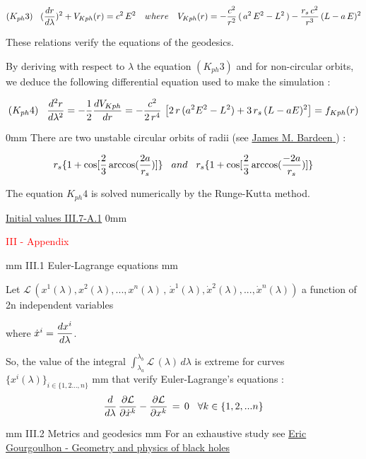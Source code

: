 \documentclass [12pt]{article}
\def\ph#1{\hskip #1}
\def\pv#1{\vskip #1}
\begin{document}
        $$(K_{ph}3)\ph 3mm  \displaystyle({dr\over d\lambda})^2+V_{Kph}(r)=c^2\,E^2 \ \ \ where\ \ \  V_{Kph}(r)=\displaystyle -{c^2\over r^2}\,(\,a^2\,E^2-L^2\,)-{r_s\,c^2\over r^3}\,(L-a\,E)^2 $$
       
       
        These relations verify the equations of the geodesics.

		By deriving with respect to $\lambda$ the equation $(K_{ph}3)$ and for non-circular orbits, we deduce the following differential equation used to make the simulation :
		
      $$(K_{ph}4)\ph 3mm \frac{d^2r}{d\lambda^2}=-\frac{1}{2}\frac{dV_{Kph}}{dr}=-\frac{c^2}{2\,r^4}\,\left[2\,r\,(a^2E^2-L^2)+3\,r_s\,(L-aE)^2\right]=f_{Kph}(r)$$
			
	\pv 50mm
		   	There are two unstable circular orbits of radii (see \href{documents/Bardeen_1972_ApJ.pdf}{\textcolor{bleu}{ James M. Bardeen} })   :
			
		$$r_s\{ 1+\cos [\frac{2}{3} \arccos(\frac{2a}{r_s})]\}\ph 3mm  and \ph 3mm  r_s\{ 1+\cos [\frac{2}{3} \arccos(\frac{-2a}{r_s})]\}$$

      The equation $K_{ph}4$ is solved numerically by the Runge-Kutta method.
			
			\hyperlink{Kerrphoton} {Initial values III.7-A.1}
			\pv 10mm
			
							\hypertarget{ancre05}{\centerline{\large\textcolor{red}{ III - Appendix } }} \pv4mm
            \hypertarget{ancre06}{{\bidon III.1 Euler-Lagrange equations }} \pv3mm  

					Let $\mathcal L\,(x^1(\lambda),x^2(\lambda),...,x^n(\lambda)\, , \,\dot x^1(\lambda),\dot x^2(\lambda),...,\dot x^n(\lambda))$
			a function of 2n independent variables 
			
			where $\dot x^i= \displaystyle{dx^i \over d\lambda}$. 
			
			So, the value of the integral $\displaystyle\int_{\lambda_a}^{\lambda_b} \mathcal L \,(\lambda)\,d\lambda$ is extreme for curves $\{x^i(\lambda)\}_{i\in\{1,2...,n\}}$ 
			\pv 2mm
			that verify Euler-Lagrange's equations :
		$$ {d\over d\lambda}\,{\partial\mathcal L \over \partial\dot x^k} -{\partial\mathcal L\over \partial x^k}\,=\,0  \ph 3mm  \forall k\in\{1,2,...n\}$$
		 
\pv 3mm
		\hypertarget{ancre07}{{\bidon III.2  Metrics and geodesics }} \pv3mm
		For an exhaustive study see \href{https://luth.obspm.fr/~luthier/gourgoulhon/bh16/bholes.pdf}{\textcolor{bleu}{Eric Gourgoulhon - Geometry and physics of black holes } } 
		
\end{document}

